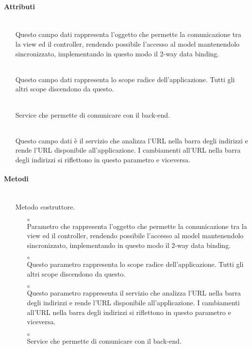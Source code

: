\paragraph*{Attributi}
\begin{itemize}
\item[]  \\ Questo campo dati rappresenta l'oggetto che permette la comunicazione tra la view ed il controller, rendendo possibile l’accesso al model mantenendolo sincronizzato, implementando in questo modo il 2-way data binding.
\item[]  \\ Questo campo dati rappresenta lo scope radice dell'applicazione. Tutti gli altri scope discendono da questo.
\item[]  \\ Service che permette di comunicare con il back-end.
\item[]  \\ Questo campo dati è il servizio che analizza l'URL nella barra degli indirizzi e rende l'URL disponibile all'applicazione. I cambiamenti all'URL nella barra degli indirizzi si riflettono in questo parametro e viceversa.
\end{itemize}

\paragraph*{Metodi}
\begin{itemize}
\item[]  \\ Metodo costruttore.
\begin{itemize}\addtolength{\itemsep}{-0.5\baselineskip}
\item[$\circ$]  \\ Parametro che rappresenta l'oggetto che permette la comunicazione tra la view ed il controller, rendendo possibile l’accesso al model mantenendolo sincronizzato, implementando in questo modo il 2-way data binding.
\item[$\circ$]  \\ Questo parametro rappresenta lo scope radice dell'applicazione. Tutti gli altri scope discendono da questo.
\item[$\circ$]  \\ Questo parametro rappresenta il servizio che analizza l'URL nella barra degli indirizzi e rende l'URL disponibile all'applicazione. I cambiamenti all'URL nella barra degli indirizzi si riflettono in questo parametro e viceversa.
\item[$\circ$]  \\ Service che permette di comunicare con il back-end.
\end{itemize}
\end{itemize}

